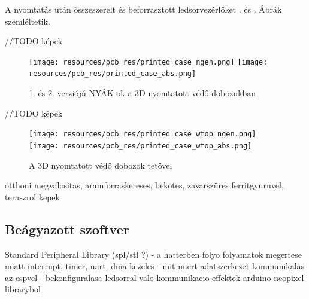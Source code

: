 \documentclass[../main.tex]{subfiles}
\begin{document}
            A nyomtatás után összeszerelt és beforrasztott ledsorvezérlőket . és . Ábrák szemléltetik.
            
            //TODO képek
            \begin{figure}[h!]
                \centering
                    \texttt{[image: resources/pcb\_res/printed\_case\_ngen.png]}
                    \texttt{[image: resources/pcb\_res/printed\_case\_abs.png]}
                    \caption{1. és 2. verziójú NYÁK-ok a 3D nyomtatott védő dobozukban}
                    \label{fig:printed_cases_1}
            \end{figure}
            
            //TODO képek
            \begin{figure}[h!]
                \centering
                    \texttt{[image: resources/pcb\_res/printed\_case\_wtop\_ngen.png]}
                    \texttt{[image: resources/pcb\_res/printed\_case\_wtop\_abs.png]}
                    \caption{A 3D nyomtatott védő dobozok tetővel}
                    \label{fig:printed_cases_2}
            \end{figure}
    
otthoni megvalositas, aramforraskereses, bekotes, zavarszüres ferritgyuruvel, teraszrol kepek\\

    \subsection{Beágyazott szoftver}
        Standard Peripheral Library (spl/stl ?) - a hatterben folyo folyamatok megertese miatt
        interrupt, timer, uart, dma kezeles - mit miert
        adatszerkezet
        kommunikalas az espvel - bekonfiguralasa
        ledsorral valo kommunikacio
        effektek arduino neopixel librarybol 
\end{document}
